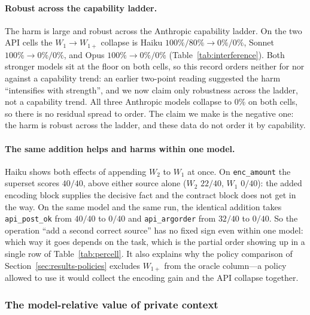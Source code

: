 \documentclass[11pt]{article}
\theoremstyle{plain}
\theoremstyle{definition}
\theoremstyle{remark}
\begin{document}
\paragraph{Robust across the capability ladder.}
The harm is large and robust across the Anthropic capability ladder. On the two API cells the
$W_1 \to W_{1+}$ collapse is Haiku $100\%/80\% \to 0\%/0\%$, Sonnet $100\% \to 0\%/0\%$, and Opus
$100\% \to 0\%/0\%$ (Table~\ref{tab:interference}). Both stronger models sit at the floor on both
cells, so this record orders neither for nor against a capability trend: an earlier two-point
reading suggested the harm ``intensifies with strength'', and we now claim only robustness
across the ladder, not a capability trend. All three Anthropic models collapse to $0\%$ on both
cells, so there is no residual spread to order. The claim we make is the negative one: the harm
is robust across the ladder, and these data do not order it by capability.

\paragraph{The same addition helps and harms within one model.} Haiku shows both effects of
appending $W_2$ to $W_1$ at once. On \texttt{enc\_amount} the superset scores $40/40$, above
either source alone ($W_2$ $22/40$, $W_1$ $0/40$): the added encoding block supplies the
decisive fact and the contract block does not get in the way. On the same model and the same
run, the identical addition takes \texttt{api\_post\_ok} from $40/40$ to $0/40$ and
\texttt{api\_argorder} from $32/40$ to $0/40$. So the operation ``add a second correct source''
has no fixed sign even within one model: which way it goes depends on the task, which is the
partial order showing up in a single row of Table~\ref{tab:percell}. It also explains why the
policy comparison of Section~\ref{sec:results-policies} excludes $W_{1+}$ from the oracle
column---a policy allowed to use it would collect the encoding gain and the API collapse
together.

\subsubsection{The model-relative value of private context}
\label{sec:results-moat}
\end{document}
